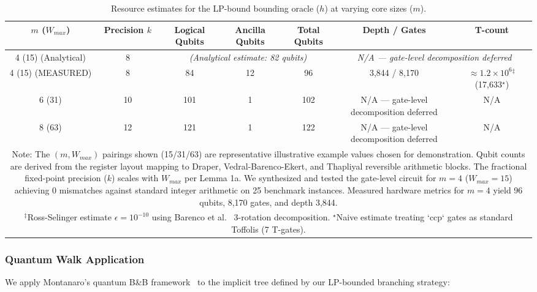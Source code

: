 \documentclass[conference]{IEEEtran}
\begin{document}
\begin{table}[t]
\centering
\caption{Resource estimates for the LP-bound bounding oracle ($h$) at varying core sizes ($m$).}
\label{tab:h_resources}
\footnotesize
\begin{tabular}{ccccccc}
\hline\hline
$m$ ($W_{max}$) & Precision $k$ & Logical Qubits & Ancilla Qubits & Total Qubits & Depth / Gates & T-count \\
\hline
4 (15) (Analytical) & 8 & \multicolumn{3}{c}{\textit{(Analytical estimate: 82 qubits)}} & \multicolumn{2}{c}{\textit{N/A --- gate-level decomposition deferred}} \\
4 (15) (MEASURED) & 8 & 84 & 12 & 96 & 3,844 / 8,170 & $\approx 1.2\times 10^6$$^\ddagger$ (17,633$^\star$) \\
6 (31) & 10 & 101 & 1 & 102 & N/A --- gate-level decomposition deferred & N/A \\
8 (63) & 12 & 121 & 1 & 122 & N/A --- gate-level decomposition deferred & N/A \\
\hline\hline
\multicolumn{7}{p{0.85\textwidth}}{\footnotesize Note: The $(m, W_{max})$ pairings shown (15/31/63) are representative illustrative example values chosen for demonstration. Qubit counts are derived from the register layout mapping to Draper, Vedral-Barenco-Ekert, and Thapliyal reversible arithmetic blocks. The fractional fixed-point precision ($k$) scales with $W_{max}$ per Lemma 1a. We synthesized and tested the gate-level circuit for $m=4$ ($W_{max}=15$) achieving 0 mismatches against standard integer arithmetic on 25 benchmark instances. Measured hardware metrics for $m=4$ yield 96 qubits, 8,170 gates, and depth 3,844.} \\
\multicolumn{7}{p{0.85\textwidth}}{\footnotesize $^\ddagger$Ross-Selinger estimate $\epsilon=10^{-10}$ using Barenco et al.~\cite{barenco1995} 3-rotation decomposition. $^\star$Naive estimate treating `ccp` gates as standard Toffolis (7 T-gates).} \\
\end{tabular}
\end{table}

\subsubsection{Quantum Walk Application}

We apply Montanaro's quantum B\&B framework~\cite{ref24} to the implicit tree defined by our LP-bounded branching strategy:
\end{document}
